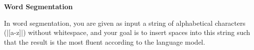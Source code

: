 \item {\bf Word Segmentation}

In word segmentation, you are given as input a string of alphabetical characters
(|[a-z]|) without whitespace, and your goal is to insert spaces into this
string such that the result is the most fluent according to the language model.

\begin{enumerate}

  

  

  

\end{enumerate}
